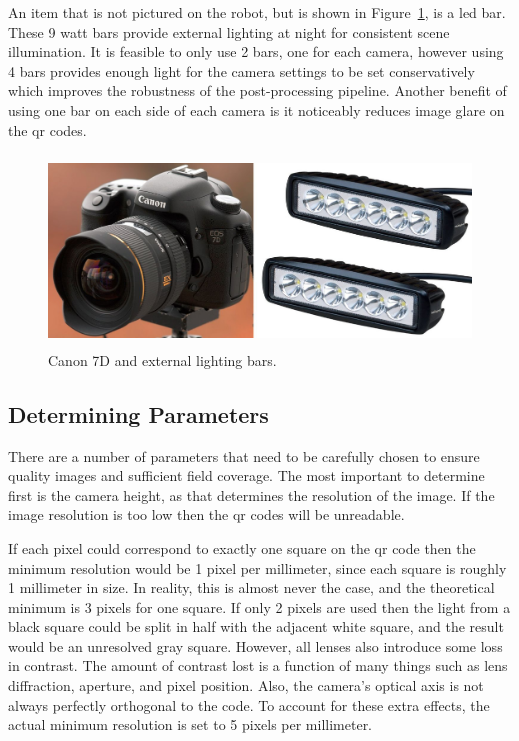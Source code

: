An item that is not pictured on the robot, but is shown in Figure~\ref{figure:canon_and_bars}, is a \ac{led} bar.  These 9 watt bars provide external lighting at night for consistent scene illumination.  It is feasible to only use 2 bars, one for each camera, however using 4 bars provides enough light for the camera settings to be set conservatively which improves the robustness of the post-processing pipeline.  Another benefit of using one bar on each side of each camera is it noticeably reduces image glare on the \ac{qr} codes.  

\begin{figure}
	\centering
    \includegraphics[height=2in]{figures/canon7d_and_LEDs.jpg}
    \caption[Canon 7D and LED bars]{Canon 7D and external lighting bars.}
    \label{figure:canon_and_bars}
\end{figure}

\subsection{Determining Parameters}
\label{section:determining_parameters}

There are a number of parameters that need to be carefully chosen to ensure quality images and sufficient field coverage.  The most important to determine first is the camera height, as that determines the resolution of the image.  If the image resolution is too low then the \ac{qr} codes will be unreadable.  

If each pixel could correspond to exactly one square on the \ac{qr} code then the minimum resolution would be 1 pixel per millimeter, since each square is roughly 1 millimeter in size.  In reality, this is almost never the case, and the theoretical minimum is 3 pixels for one square.  If only 2 pixels are used then the light from a black square could be split in half with the adjacent white square, and the result would be an unresolved gray square.  However, all lenses also introduce some loss in contrast.  The amount of contrast lost is a function of many things such as lens diffraction, aperture, and pixel position.  Also, the camera's optical axis is not always perfectly orthogonal to the code.  To account for these extra effects, the actual minimum resolution is set to 5 pixels per millimeter.  


